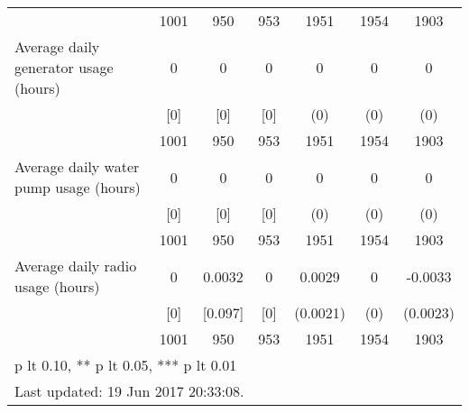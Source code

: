 \begin{table}[htbp]
\begin{tabular*}{1\hsize}{@{\hskip\tabcolsep\extracolsep\fill}l*{1}{cccccc}}
                                &     1001&      950&      953&     1951         &     1954         &     1903         \\
Average daily generator usage (hours)&        0&        0&        0&        0         &        0         &        0         \\
                                &      [0]&      [0]&      [0]&      (0)         &      (0)         &      (0)         \\
                                &     1001&      950&      953&     1951         &     1954         &     1903         \\
Average daily water pump usage (hours)&        0&        0&        0&        0         &        0         &        0         \\
                                &      [0]&      [0]&      [0]&      (0)         &      (0)         &      (0)         \\
                                &     1001&      950&      953&     1951         &     1954         &     1903         \\
Average daily radio usage (hours)&        0&   0.0032&        0&   0.0029         &        0         &  -0.0033         \\
                                &      [0]&  [0.097]&      [0]& (0.0021)         &      (0)         & (0.0023)         \\
                                &     1001&      950&      953&     1951         &     1954         &     1903         \\
\bottomrule
\multicolumn{7}{l}{\footnotesize * p lt 0.10, ** p lt 0.05, *** p lt 0.01}\\
\multicolumn{7}{l}{\footnotesize Last updated: 19 Jun 2017 20:33:08.}\\
\end{tabular*}
\end{table}
